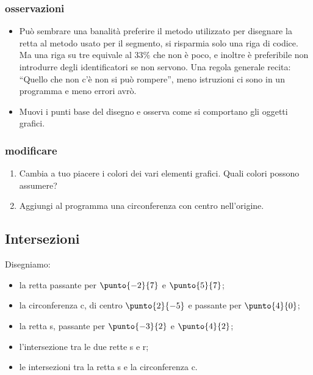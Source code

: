 \subsubsection{osservazioni}

\begin{itemize}
 \item Può sembrare una banalità preferire il metodo utilizzato per disegnare 
la retta al metodo usato per il segmento, si risparmia solo una riga di codice. 
Ma una riga su tre equivale al 33\% che non è poco, e inoltre è 
preferibile non introdurre degli identificatori se non servono. Una regola 
generale recita: ``Quello che non c'è non si può rompere'', meno istruzioni ci 
sono in un programma e meno errori avrò.

 \item Muovi i punti base del disegno e osserva come si comportano gli oggetti 
grafici.
\end{itemize}

\subsubsection{modificare}

\begin{enumerate} [noitemsep]
 \item Cambia a tuo piacere i colori dei vari elementi grafici. Quali colori 
possono assumere?
 \item Aggiungi al programma una circonferenza con centro nell'origine.
\end{enumerate}

\subsection{Intersezioni}
\label{subsec:geo_int_intersezioni}

Disegniamo:
\begin{itemize} [nosep]
 \item la retta passante per \(\punto{-2}{7}\) e \(\punto{5}{7}\); 
 \item la circonferenza c, di centro \(\punto{2}{-5}\) e 
 passante per \(\punto{4}{0}\);
 \item la retta s, passante per \(\punto{-3}{2}\) e \(\punto{4}{2}\);
 \item l'intersezione tra le due rette s e r;
 \item le intersezioni tra la retta s e la circonferenza c. 
\end{itemize}

